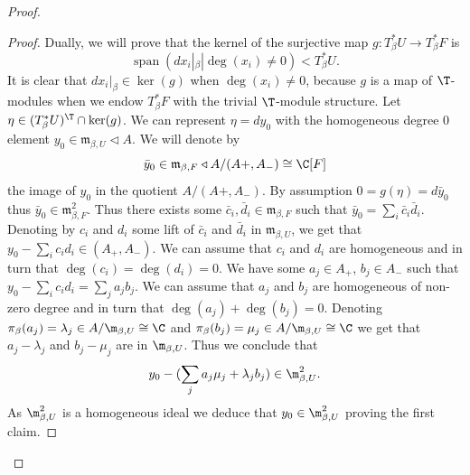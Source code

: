 \begin{proof}
	\begin{proof} Dually, we will prove that the kernel of the surjective map $g:T^*_\beta U\to T^*_\beta F$ is $$\operatorname{span}(dx_i|_\beta| \deg(x_i)\neq 0)<T^*_\beta U.$$ It is clear that $dx_i|_\beta\in \ker(g)$ when $\deg(x_i)\neq 0$, because $g$ is a map of $\T$-modules when we endow $T^*_\beta F$ with the trivial $\T$-module structure. Let $\eta\in (T^*_\beta U)^\T\cap \ker(g)$. We can represent $\eta=d {y}_0$ with the homogeneous degree $0$ element ${y}_0\in \mathfrak{m}_{\beta,U}\triangleleft A$. We will  denote by $$\bar{y}_0\in \mathfrak{m}_{\beta,F}\triangleleft A/(A+,A_-)\cong \C[F]$$ the image of ${y}_0$ in the quotient $A/(A+,A_-)$.  By assumption $0=g(\eta)=d{\bar{y}}_0$ thus $\bar{y}_0\in \mathfrak{m}_{\beta,F}^2.$ Thus there exists some $\bar{c}_i,\bar{d}_i\in  \mathfrak{m}_{\beta,F}$ such that $\bar{y}_0=\sum_i \bar{c}_i\bar{d}_i$. Denoting by ${c}_i$ and ${d}_i$ some lift of $\bar{c}_i$ and $\bar{d}_i$ in $\mathfrak{m}_{\beta,U}$, we get that ${y_0}-\sum_i {c}_i{d}_i\in (A_+,A_-)$. We can assume that  $c_i$ and $d_i$ are homogeneous and in turn that $\deg(c_i)=\deg(d_i)=0$.   We have  some $a_j\in A_+$, $b_j\in A_-$ such that ${y_0}-\sum_i {c}_i{d}_i=\sum_j a_jb_j$. We can assume that $a_j$ and $b_j$ are homogeneous of non-zero degree and in turn that $\deg(a_j)+\deg(b_j)=0$.
		Denoting $\pi_\beta(a_j)=\lambda_j \in A/\m_{\beta,U}\cong \C$ and $\pi_\beta(b_j)=\mu_j \in A/\m_{\beta,U}\cong \C$ we get that $a_j-\lambda_j$ and $b_j-\mu_j$ are in $\m_{\beta,U}$. Thus we  conclude that $$y_0-(\sum_j a_j \mu_j+\lambda_j b_j)\in \m_{\beta,U}^2.$$ As $\m_{\beta,U}^2$ is a homogeneous ideal we deduce that $y_0\in \m_{\beta,U}^2$ proving the first claim.


\end{proof}
\end{proof}
